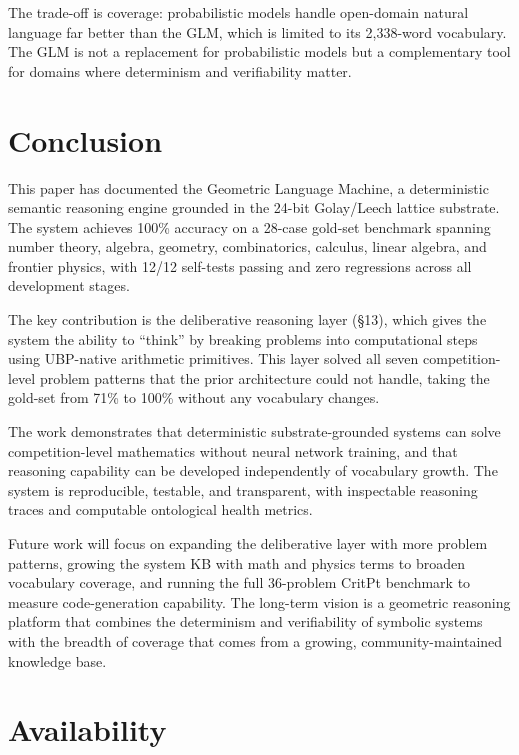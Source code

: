 \documentclass[11pt,a4paper]{article}
\begin{document}
The trade-off is coverage: probabilistic models handle open-domain natural language far better than the GLM, which is limited to its 2,338-word vocabulary. The GLM is not a replacement for probabilistic models but a complementary tool for domains where determinism and verifiability matter.

\section{Conclusion}
\label{sec:conclusion}

This paper has documented the Geometric Language Machine, a deterministic semantic reasoning engine grounded in the 24-bit Golay/Leech lattice substrate. The system achieves 100\% accuracy on a 28-case gold-set benchmark spanning number theory, algebra, geometry, combinatorics, calculus, linear algebra, and frontier physics, with 12/12 self-tests passing and zero regressions across all development stages.

The key contribution is the deliberative reasoning layer (\S13), which gives the system the ability to ``think'' by breaking problems into computational steps using UBP-native arithmetic primitives. This layer solved all seven competition-level problem patterns that the prior architecture could not handle, taking the gold-set from 71\% to 100\% without any vocabulary changes.

The work demonstrates that deterministic substrate-grounded systems can solve competition-level mathematics without neural network training, and that reasoning capability can be developed independently of vocabulary growth. The system is reproducible, testable, and transparent, with inspectable reasoning traces and computable ontological health metrics.

Future work will focus on expanding the deliberative layer with more problem patterns, growing the system KB with math and physics terms to broaden vocabulary coverage, and running the full 36-problem CritPt benchmark to measure code-generation capability. The long-term vision is a geometric reasoning platform that combines the determinism and verifiability of symbolic systems with the breadth of coverage that comes from a growing, community-maintained knowledge base.

\section*{Availability}
\end{document}
